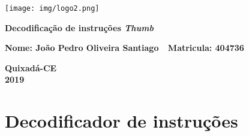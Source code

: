 \documentclass[a4paper,10pt]{article}
\begin{document}
\thispagestyle{empty}
\begin{center}

	\texttt{[image: img/logo2.png]}
		
	\vspace*{4cm}
		
	{\Large \bf Decodificação de instruções \textit{Thumb}}
		
	\vspace*{4.5cm}
		
	{\Large \bf Nome: João Pedro Oliveira Santiago	\,\,  Matricula: 404736}
		
		
	\vspace*{9.5cm}
		
	{\Large \bf Quixadá-CE\\
	2019}

\end{center}
	
\setcounter{page}{0}

	\section*{Decodificador de instruções}
	
	
\end{document}
